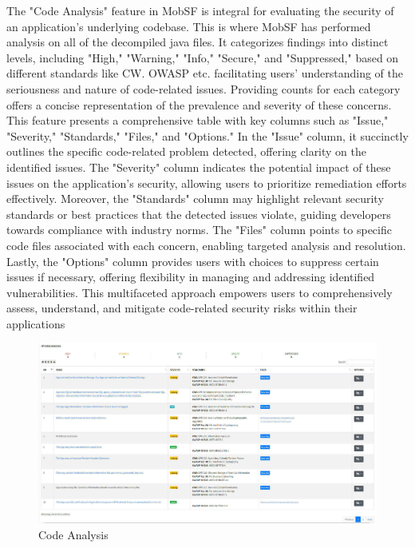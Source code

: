 \documentclass{report}
\begin{document}
The "Code Analysis" feature in MobSF is integral for evaluating the security of an application's underlying codebase. This is where MobSF has performed analysis on all of the decompiled java files.  It categorizes findings into distinct levels, including "High," "Warning," "Info," "Secure," and "Suppressed," based on different standards like CW. OWASP etc. facilitating users' understanding of the seriousness and nature of code-related issues. Providing counts for each category offers a concise representation of the prevalence and severity of these concerns.\newline
This feature presents a comprehensive table with key columns such as "Issue," "Severity," "Standards," "Files," and "Options." In the "Issue" column, it succinctly outlines the specific code-related problem detected, offering clarity on the identified issues. The "Severity" column indicates the potential impact of these issues on the application's security, allowing users to prioritize remediation efforts effectively.
\newline
Moreover, the "Standards" column may highlight relevant security standards or best practices that the detected issues violate, guiding developers towards compliance with industry norms. The "Files" column points to specific code files associated with each concern, enabling targeted analysis and resolution.
\newline
Lastly, the "Options" column provides users with choices to suppress certain issues if necessary, offering flexibility in managing and addressing identified vulnerabilities. This multifaceted approach empowers users to comprehensively assess, understand, and mitigate code-related security risks within their applications\newline
\begin{figure}[hbt!]
    \centering
    \includegraphics[width=1\textwidth]{images/codeanalysis.jpg}
    \caption{Code Analysis}
    \label{fig:example}
\end{figure}
\FloatBarrier
\end{document}
